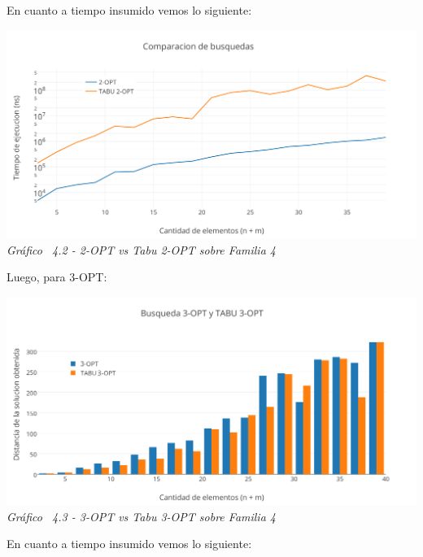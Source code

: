 En cuanto a tiempo insumido vemos lo siguiente:

\vspace*{0.3cm} \vspace*{0.3cm}
  \begin{center}
 \includegraphics[scale=0.5]{./EJ4/medicion2optgym0.png}\\
 {            \textit{Gráfico \ 4.2 - 2-OPT vs Tabu 2-OPT sobre Familia 4}}
  \end{center}
  \vspace*{0.3cm}


Luego, para 3-OPT:

\vspace*{0.3cm} \vspace*{0.3cm}
  \begin{center}
 \includegraphics[scale=0.5]{./EJ4/comparativogym03opt.png}\\
 {            \textit{Gráfico \ 4.3 - 3-OPT vs Tabu 3-OPT sobre Familia 4}}
  \end{center}
  \vspace*{0.3cm}

En cuanto a tiempo insumido vemos lo siguiente:

